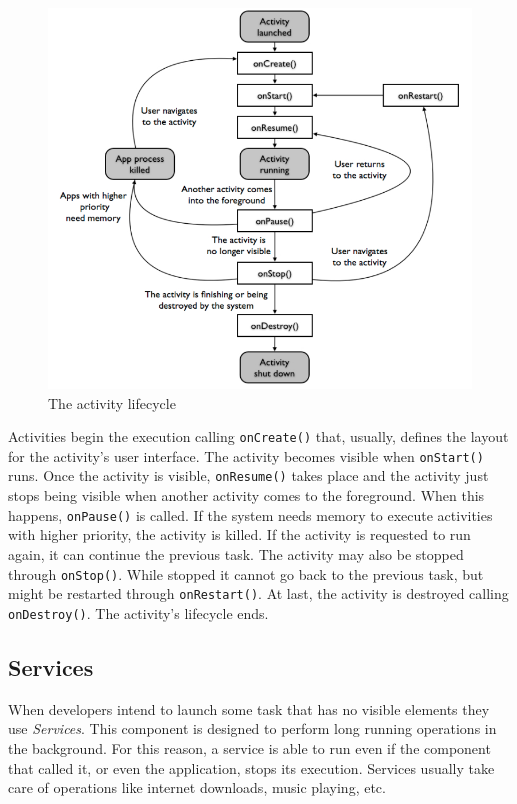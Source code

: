 \begin{figure}[h]
 \begin{center}
 \includegraphics[scale=0.5]{figures/activity_lifecycle.png}
 \end{center}
 \caption{The activity lifecycle}
 \label{fig:act_lifecycle}
\end{figure}

Activities begin the execution calling \texttt{onCreate()} that, usually, defines the layout for the activity's user interface. The activity becomes visible when \texttt{onStart()} runs. Once the activity is visible, \texttt{onResume()} takes place and the activity just stops being visible when another activity comes to the foreground. When this happens, \texttt{onPause()} is called. If the system needs memory to execute activities with higher priority, the activity is killed. If the activity is requested to run again, it can continue the previous task. The activity may also be stopped through \texttt{onStop()}. While stopped it cannot go back to the previous task, but might be restarted through \texttt{onRestart()}. At last, the activity is destroyed calling \texttt{onDestroy()}. The activity's lifecycle ends.

\subsection{Services}

When developers intend to launch some task that has no visible elements they use \textit{Services}. This component is designed to perform long running operations in the background. For this reason, a service is able to run even if the component that called it, or even the application, stops its execution. Services usually take care of operations like internet downloads, music playing, etc.

